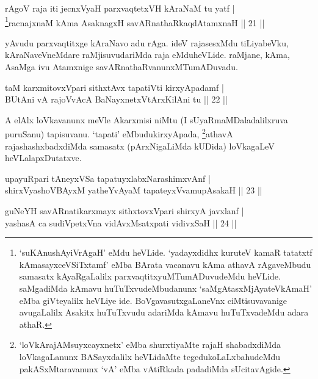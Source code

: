 
\begin{shl}
rAgoV raja iti jecnxVyaH parxvaqtetxVH kAraNaM tu yatf  | \\
\footnote{`suKAnushAyiVrAgaH' eMdu heVLide. `yadayxdidhx kuruteV kamaR tatatxtf kAmasayxceVSiTxtamf' eMba BArata vacanavu kAma athavA rAgaveMbudu samasatx kAyaRgaLalilx parxvaqtitxyuMTu\-mADuvudeMdu heVLide. saMgadiMda kAmavu huTuTxvudeMbudanunx `saMgAtasxMjAyateVkAmaH' eMba giVteyalilx heVLiye ide. BoVgavasutxgaLaneVnx ciMtisuvavanige avugaLalilx Asakitx huTuTxvudu adariMda kAmavu huTuTxvadeMdu adara athaR.}racnajxnaM kAma AsaknagxH savARnathaRkaqdAtamxnaH \hfill ||  21 || 
\end{shl}

\begin{artha} 
yAvudu parxvaqtitxge kAraNavo adu rAga. ideV rajasesxMdu tiLiyabeVku, 
kAraNaveVneMdare raMjisuvudariMda raja eMdu\break heVLide. raMjane, kAma, 
AsaMga ivu Atamxnige savARnathaRvanunxMTumADuvadu.
\end{artha}


\begin{shl}
taM karxmitovxVpari sithxtAvx tapatiVti kirxyApadamf | \\
BUtAni vA rajoVvAcA BaNayxnetxV\s tArxKilAni tu \hfill ||  22 || 
\end{shl}

\begin{artha} 
A elAlx loVkavanunx meVle Akarxmisi niMtu (I sUyaRmaMDaladalilxruva 
puruSanu) tapisuvanu. `tapati' eMbudu\break kirxyApada, 
\footnote{`loVkArajAMsuyxcayxnetx' eMba shurxtiyaMte rajaH 
shabadxdiMda loVkagaLanunx BASayxdalilx heVLidaMte 
tegedukoLaLxbahudeMdu pakASxMtaravanunx `vA' eMba vAtiRkada padadiMda 
sUcitavAgide.}athavA 
rajashashxbadxdiMda samasatx (pArxNigaLiMda kUDida) loVkagaLeV heVLalapxDutatxve.
\end{artha}

\begin{shl}
upayuRpari tAneyxVSa tapatuyxlabxNarashimxvAnf | \\
shirxVyashoVBAyxM yatheYvAyaM tapateyxVvamupAsakaH \hfill ||  23 ||
\end{shl}

\begin{shl}
guNeYH savARnatikarxmayx sithxtovxVpari shirxyA javxlanf | \\
yashasA ca sudiVpetxVna vidAvxMsatxpati vidivxSaH \hfill ||  24 || 
\end{shl}

